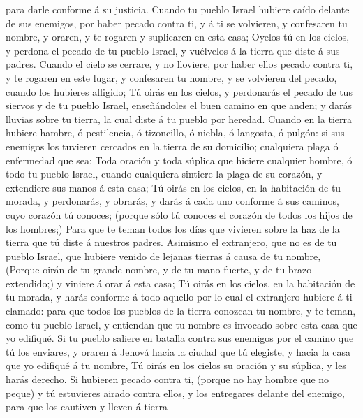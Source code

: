 para darle conforme á su justicia.  Cuando tu pueblo
Israel hubiere caído delante de sus enemigos, por haber pecado contra
ti, y á ti se volvieren, y confesaren tu nombre, y oraren, y te rogaren
y suplicaren en esta casa;  Oyelos tú en los cielos, y
perdona el pecado de tu pueblo Israel, y vuélvelos á la tierra que diste
á sus padres.  Cuando el cielo se cerrare, y no lloviere,
por haber ellos pecado contra ti, y te rogaren en este lugar, y
confesaren tu nombre, y se volvieren del pecado, cuando los hubieres
afligido;  Tú oirás en los cielos, y perdonarás el pecado
de tus siervos y de tu pueblo Israel, enseñándoles el buen camino en que
anden; y darás lluvias sobre tu tierra, la cual diste á tu pueblo por
heredad.  Cuando en la tierra hubiere hambre, ó
pestilencia, ó tizoncillo, ó niebla, ó langosta, ó pulgón: si sus
enemigos los tuvieren cercados en la tierra de su domicilio; cualquiera
plaga ó enfermedad que sea;  Toda oración y toda súplica
que hiciere cualquier hombre, ó todo tu pueblo Israel, cuando cualquiera
sintiere la plaga de su corazón, y extendiere sus manos á esta casa;
 Tú oirás en los cielos, en la habitación de tu morada, y
perdonarás, y obrarás, y darás á cada uno conforme á sus caminos, cuyo
corazón tú conoces; (porque sólo tú conoces el corazón de todos los
hijos de los hombres;)  Para que te teman todos los días
que vivieren sobre la haz de la tierra que tú diste á nuestros padres.
 Asimismo el extranjero, que no es de tu pueblo Israel,
que hubiere venido de lejanas tierras á causa de tu nombre,
 (Porque oirán de tu grande nombre, y de tu mano fuerte,
y de tu brazo extendido;) y viniere á orar á esta casa; 
Tú oirás en los cielos, en la habitación de tu morada, y harás conforme
á todo aquello por lo cual el extranjero hubiere á ti clamado: para que
todos los pueblos de la tierra conozcan tu nombre, y te teman, como tu
pueblo Israel, y entiendan que tu nombre es invocado sobre esta casa que
yo edifiqué.  Si tu pueblo saliere en batalla contra sus
enemigos por el camino que tú los enviares, y oraren á Jehová hacia la
ciudad que tú elegiste, y hacia la casa que yo edifiqué á tu nombre,
 Tú oirás en los cielos su oración y su súplica, y les
harás derecho.  Si hubieren pecado contra ti, (porque no
hay hombre que no peque) y tú estuvieres airado contra ellos, y los
entregares delante del enemigo, para que los cautiven y lleven á tierra

